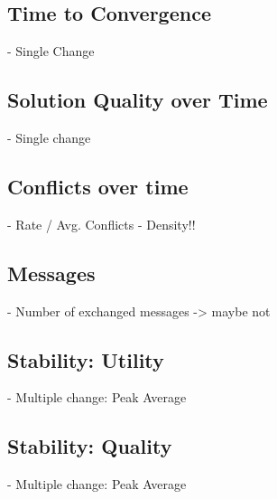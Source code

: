 \subsection{Time to Convergence}
- Single Change
\subsection{Solution Quality over Time}
- Single change
\subsection{Conflicts over time}
- Rate / Avg. Conflicts - Density!!
\subsection{Messages}
- Number of exchanged messages -> maybe not
\subsection{Stability: Utility}
- Multiple change: Peak Average
\subsection{Stability: Quality}
- Multiple change: Peak Average


